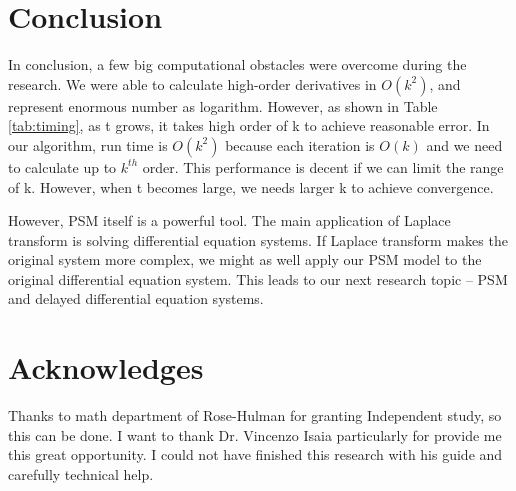 \documentclass[12pt]{article}
\begin{document}
\section{Conclusion}
In conclusion, a few big computational obstacles were overcome during the research. We were able to calculate high-order derivatives in $O(k^{2})$, and represent enormous number as logarithm. However, as shown in Table \ref{tab:timing}, as t grows, it takes high order of k to achieve reasonable error. In our algorithm, run time is $O(k^{2})$ because each iteration is $O(k)$ and we need to calculate up to $k^{th}$ order. This performance is decent if we can limit the range of k. However, when t becomes large, we needs larger k to achieve convergence.

However, PSM itself is a powerful tool. The main application of Laplace transform is solving differential equation systems. If Laplace transform makes the original system more complex, we might as well apply our PSM model to the original differential equation system. This leads to our next research topic -- PSM and delayed differential equation systems.


\section{Acknowledges}
Thanks to math department of Rose-Hulman for granting Independent study, so this can be done. I want to thank Dr. Vincenzo Isaia particularly for provide me this great opportunity. I could not have finished this research with his guide and carefully technical help.

\clearpage

\end{document}
